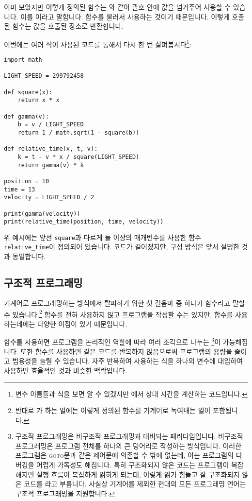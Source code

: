 \documentclass[../main.tex]{subfiles}
\begin{document}
이미 보았지만 이렇게 정의된 함수는 와 같이 괄호 안에 값을 넘겨주어 사용할 수 있습니다.
이를 이라고 말합니다.
함수를 불러서 사용하는 것이기 때문입니다.
이렇게 호출된 함수는 값을 호출된 장소로 반환합니다.

이번에는 여러 식이 사용된 코드를 통해서 다시 한 번 살펴봅시다\footnote{변수 이름들과 식을 보면 알 수 있겠지만 에서 상대 시간을 계산하는 코드입니다.}:
\begin{verbatim}
import math

LIGHT_SPEED = 299792458

def square(x):
    return x * x

def gamma(v):
    b = v / LIGHT_SPEED
    return 1 / math.sqrt(1 - square(b))

def relative_time(x, t, v):
    k = t - v * x / square(LIGHT_SPEED)
    return gamma(v) * k

position = 10
time = 13
velocity = LIGHT_SPEED / 2

print(gamma(velocity))
print(relative_time(position, time, velocity))
\end{verbatim}
위 예시에는 앞선 \verb/square/과 다르게 둘 이상의 매개변수를 사용한 함수 \verb/relative_time/이 정의되어 있습니다.
코드가 길어졌지만, 구성 방식은 앞서 설명한 것과 동일합니다.

\subsection{구조적 프로그래밍}
기계어로 프로그래밍하는 방식에서 탈피하기 위한 첫 걸음마 중 하나가 함수라고 말할 수 있습니다.\footnote{반대로 가 하는 일에는 이렇게 정의된 함수를 기계어로 녹여내는 일이 포함됩니다.}
함수를 전혀 사용하지 않고 프로그램을 작성할 수는 있지만, 함수를 사용하는데에는 다양한
이점이 있기 때문입니다.

함수를 사용하면 프로그램을 논리적인 역할에 따라 여러 조각으로 나누는 \footnote{구조적 프로그래밍은 비구조적 프로그래밍과 대비되는
패러다임입니다. 비구조적 프로그래밍은 프로그램 전체를 하나의 큰 덩어리로 작성하는 방식입니다. 이러한 프로그램은 \textsc{goto}문과 같은 제어문에
의존할 수 밖에 없는데, 이는 프로그램의 디버깅을 어렵게 가독성도 해칩니다.
특히 구조화되지 않은 코드는 프로그램이 복잡해지면 실행 흐름이 복잡하게 얽히게
되는데, 이렇게 읽기 힘들고 잘 구조화되지 않은 코드를 라고 부릅니다.
사실상 기계어를 제외한 현대의 모든 프로그래밍 언어는 구조적 프로그래밍을 지원합니다.}이 가능해집니다.
또한 함수를 사용하면 같은 코드를 반복하지 않음으로써 프로그램의 용량을 줄이고 범용성을 늘릴 수 있습니다.
자주 반복하여 사용하는 식을 하나의 변수에 대입하여 사용하면 효율적인 것과 비슷한 맥락입니다.
\end{document}
